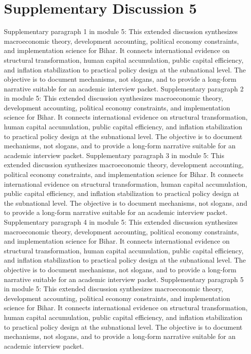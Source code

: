 \documentclass[preprint,12pt]{elsarticle}
\begin{document}
\section{Supplementary Discussion 5}
Supplementary paragraph 1 in module 5: This extended discussion synthesizes macroeconomic theory, development accounting, political economy constraints, and implementation science for Bihar. It connects international evidence on structural transformation, human capital accumulation, public capital efficiency, and inflation stabilization to practical policy design at the subnational level. The objective is to document mechanisms, not slogans, and to provide a long-form narrative suitable for an academic interview packet.
Supplementary paragraph 2 in module 5: This extended discussion synthesizes macroeconomic theory, development accounting, political economy constraints, and implementation science for Bihar. It connects international evidence on structural transformation, human capital accumulation, public capital efficiency, and inflation stabilization to practical policy design at the subnational level. The objective is to document mechanisms, not slogans, and to provide a long-form narrative suitable for an academic interview packet.
Supplementary paragraph 3 in module 5: This extended discussion synthesizes macroeconomic theory, development accounting, political economy constraints, and implementation science for Bihar. It connects international evidence on structural transformation, human capital accumulation, public capital efficiency, and inflation stabilization to practical policy design at the subnational level. The objective is to document mechanisms, not slogans, and to provide a long-form narrative suitable for an academic interview packet.
Supplementary paragraph 4 in module 5: This extended discussion synthesizes macroeconomic theory, development accounting, political economy constraints, and implementation science for Bihar. It connects international evidence on structural transformation, human capital accumulation, public capital efficiency, and inflation stabilization to practical policy design at the subnational level. The objective is to document mechanisms, not slogans, and to provide a long-form narrative suitable for an academic interview packet.
Supplementary paragraph 5 in module 5: This extended discussion synthesizes macroeconomic theory, development accounting, political economy constraints, and implementation science for Bihar. It connects international evidence on structural transformation, human capital accumulation, public capital efficiency, and inflation stabilization to practical policy design at the subnational level. The objective is to document mechanisms, not slogans, and to provide a long-form narrative suitable for an academic interview packet.
\end{document}
